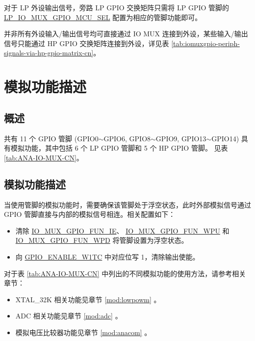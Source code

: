 \documentclass[main\_\_CN.tex]{subfiles}
\begin{document}
对于 LP 外设输出信号，旁路 LP GPIO 交换矩阵只需将 LP GPIO 管脚的 \hyperref[fielddesc:LPIOMUXGPIONMCUSEL] {LP\_IO\_MUX\_GPIO\_MCU\_SEL} 配置为相应的管脚功能即可。
\begin{tiplisting}
并非所有外设输入/输出信号均可直接通过 IO MUX 连接到外设，某些输入/输出信号只能通过 HP GPIO 交换矩阵连接到外设，详见表 \ref{tab:iomuxgpio-periph-signals-via-hp-gpio-matrix-cn}。
\end{tiplisting}

\section{模拟功能描述}

\subsection{概述}
\chipname{} 共有 11 个 GPIO 管脚 (GPIO0$\sim$GPIO6, GPIO8$\sim$GPIO9, GPIO13$\sim$GPIO14) 具有模拟功能，其中包括 6 个 LP GPIO 管脚和 5 个 HP GPIO 管脚。
见表 \ref{tab:ANA-IO-MUX-CN}。

\subsection{模拟功能描述}
当使用管脚的模拟功能时，需要确保该管脚处于浮空状态，此时外部模拟信号通过 GPIO 管脚直接与内部的模拟信号相连。相关配置如下：

\begin{itemize}
    \item 清除 \hyperref[fielddesc:IOMUXGPIONFUNIE]{IO\_MUX\_GPIO\_FUN\_IE}、 \hyperref[fielddesc:IOMUXGPIONFUNWPU]{IO\_MUX\_GPIO\_FUN\_WPU} 和 \hyperref[fielddesc:IOMUXGPIONFUNWPD]{IO\_MUX\_GPIO\_FUN\_WPD} 将管脚设置为浮空状态。
    \item 向 \hyperref[regdesc:GPIOENABLEW1TCREG]{GPIO\_ENABLE\_W1TC} 中对应位写 1，清除输出使能。
\end{itemize}

对于表 \ref{tab:ANA-IO-MUX-CN} 中列出的不同模拟功能的使用方法，请参考相关章节：

\begin{itemize}
    \item XTAL\_32K 相关功能见章节 \ref{mod:lowpowm} \textit{}。
    \item ADC 相关功能见章节 \ref{mod:adc} \textit{}。
    \item 模拟电压比较器功能见章节 \ref{mod:anacom} \textit{}。
\end{itemize}
\end{document}
